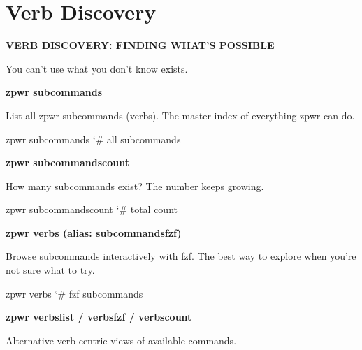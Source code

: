 \documentclass[11pt,a4paper,twoside]{book}
\begin{document}
\vspace{16pt}

\section{Verb Discovery}


\vspace{10pt}
{\large\bfseries\color{neoncyan} VERB DISCOVERY: FINDING WHAT'S POSSIBLE}\vspace{6pt}

You can't use what you don't know exists.


\vspace{12pt}
{\bfseries\color{neonyellow} zpwr subcommands}\vspace{4pt}

List all zpwr subcommands (verbs). The master index of everything zpwr can do.

\begin{codebox}
\color{neongreen}zpwr subcommands             {\char`\#} all subcommands\\
\end{codebox}


\vspace{12pt}
{\bfseries\color{neonyellow} zpwr subcommandscount}\vspace{4pt}

How many subcommands exist? The number keeps growing.

\begin{codebox}
\color{neongreen}zpwr subcommandscount        {\char`\#} total count\\
\end{codebox}


\vspace{12pt}
{\bfseries\color{neonyellow} zpwr verbs (alias: subcommandsfzf)}\vspace{4pt}

Browse subcommands interactively with fzf. The best way to explore when you're not sure what to try.

\begin{codebox}
\color{neongreen}zpwr verbs         {\char`\#} fzf subcommands\\
\end{codebox}


\vspace{12pt}
{\bfseries\color{neonyellow} zpwr verbslist / verbsfzf / verbscount}\vspace{4pt}

Alternative verb-centric views of available commands.
\end{document}
